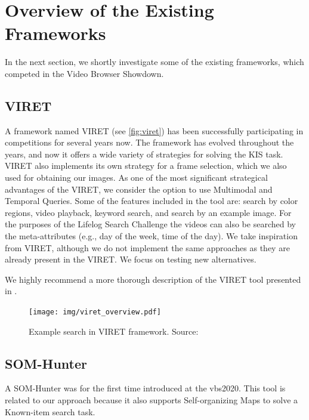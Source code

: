 \section{Overview of the Existing Frameworks}

In the next section, we shortly investigate some of the existing frameworks, which competed in the Video Browser Showdown. 

\subsection{VIRET}

A framework named VIRET \citep{lokovc2019framework, lokovc2019viret}(see \autoref{fig:viret}) has been successfully participating in competitions for several years now. The framework has evolved throughout the years, and now it offers a wide variety of strategies for solving the KIS task. VIRET also implements its own strategy for a frame selection, which we also used for obtaining our images. As one of the most significant strategical advantages of the VIRET, we consider the option to use Multimodal and Temporal Queries. Some of the features included in the tool are: search by color regions, video playback, keyword search, and search by an example image. For the purposes of the Lifelog Search Challenge \citep{LSC20} the videos can also be searched by the meta-attributes (e.g., day of the week, time of the day). We take inspiration from VIRET, although we do not implement the same approaches as they are already present in the VIRET. We focus on testing new alternatives.

We highly recommend a more thorough description of the VIRET tool presented in \cite{kovalvcik2020viret}.

\begin{figure}
    \centering
    \texttt{[image: img/viret\_overview.pdf]}
    \caption[Example search in VIRET framework]{Example search in VIRET framework. Source: \cite{kovalvcik2020viret}}
    \label{fig:viret}
\end{figure}

\subsection{SOM-Hunter}

A SOM-Hunter was for the first time introduced at the \acrshort{vbs}2020. This tool is related to our approach because it also supports Self-organizing Maps to solve a Known-item search task. 

